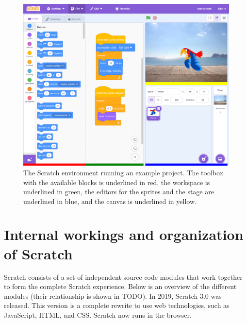 \documentclass[./main]{subfiles}
\begin{document}
\begin{figure}
    \centering
    \begin{wide}
        \includegraphics[width=\linewidth]{scratch-blink/scratch-normal-ide}
    \end{wide}
    \caption{The Scratch environment running an example project.
    The toolbox with the available blocks is underlined in red, the workspace is underlined in green, the editors for the sprites and the stage are underlined in blue, and the canvas is underlined in yellow.}
    \label{fig:scratch-ide-intro}
\end{figure}


\section{Internal workings and organization of Scratch}\label{sec:scratch-internal}

Scratch consists of a set of independent source code modules that work together to form the complete Scratch experience.
Below is an overview of the different modules (their relationship is shown in TODO).
In 2019, Scratch 3.0 was released.
This version is a complete rewrite to use web technologies, such as JavaScript, HTML, and CSS.
Scratch now runs in the browser.
\end{document}
